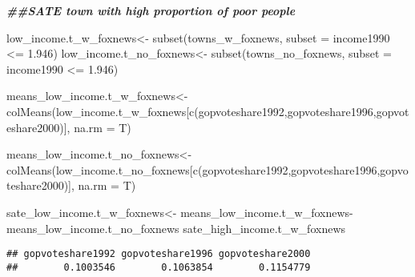 \documentclass[
]{article}
\newenvironment{Shaded}{\begin{snugshade}}{\end{snugshade}}
\newcommand{\AttributeTok}[1]{\textcolor[rgb]{0.77,0.63,0.00}{#1}}
\newcommand{\DocumentationTok}[1]{\textcolor[rgb]{0.56,0.35,0.01}{\textbf{\textit{#1}}}}
\newcommand{\FloatTok}[1]{\textcolor[rgb]{0.00,0.00,0.81}{#1}}
\newcommand{\FunctionTok}[1]{\textcolor[rgb]{0.00,0.00,0.00}{#1}}
\newcommand{\NormalTok}[1]{#1}
\newcommand{\OtherTok}[1]{\textcolor[rgb]{0.56,0.35,0.01}{#1}}
\newcommand{\SpecialCharTok}[1]{\textcolor[rgb]{0.00,0.00,0.00}{#1}}
\newcommand{\StringTok}[1]{\textcolor[rgb]{0.31,0.60,0.02}{#1}}
\begin{document}
\begin{Shaded}
\begin{Highlighting}[]
\DocumentationTok{\#\#SATE town with high proportion of poor people}

\NormalTok{low\_income.t\_w\_foxnews}\OtherTok{\textless{}{-}} \FunctionTok{subset}\NormalTok{(towns\_w\_foxnews, }\AttributeTok{subset =}\NormalTok{ income1990 }\SpecialCharTok{\textless{}=} \FloatTok{1.946}\NormalTok{)}
\NormalTok{low\_income.t\_no\_foxnews}\OtherTok{\textless{}{-}} \FunctionTok{subset}\NormalTok{(towns\_no\_foxnews, }\AttributeTok{subset =}\NormalTok{ income1990 }\SpecialCharTok{\textless{}=} \FloatTok{1.946}\NormalTok{)}


\NormalTok{means\_low\_income.t\_w\_foxnews}\OtherTok{\textless{}{-}}\FunctionTok{colMeans}\NormalTok{(low\_income.t\_w\_foxnews[}\FunctionTok{c}\NormalTok{(}\StringTok{\textquotesingle{}gopvoteshare1992\textquotesingle{}}\NormalTok{,}\StringTok{\textquotesingle{}gopvoteshare1996\textquotesingle{}}\NormalTok{,}\StringTok{\textquotesingle{}gopvoteshare2000\textquotesingle{}}\NormalTok{)], }\AttributeTok{na.rm =}\NormalTok{ T)}

\NormalTok{means\_low\_income.t\_no\_foxnews}\OtherTok{\textless{}{-}}\FunctionTok{colMeans}\NormalTok{(low\_income.t\_no\_foxnews[}\FunctionTok{c}\NormalTok{(}\StringTok{\textquotesingle{}gopvoteshare1992\textquotesingle{}}\NormalTok{,}\StringTok{\textquotesingle{}gopvoteshare1996\textquotesingle{}}\NormalTok{,}\StringTok{\textquotesingle{}gopvoteshare2000\textquotesingle{}}\NormalTok{)], }\AttributeTok{na.rm =}\NormalTok{ T)}


\NormalTok{sate\_low\_income.t\_w\_foxnews}\OtherTok{\textless{}{-}}\NormalTok{ means\_low\_income.t\_w\_foxnews}\SpecialCharTok{{-}}\NormalTok{ means\_low\_income.t\_no\_foxnews}
\NormalTok{sate\_high\_income.t\_w\_foxnews}
\end{Highlighting}
\end{Shaded}

\begin{verbatim}
## gopvoteshare1992 gopvoteshare1996 gopvoteshare2000 
##        0.1003546        0.1063854        0.1154779
\end{verbatim}
\end{document}
